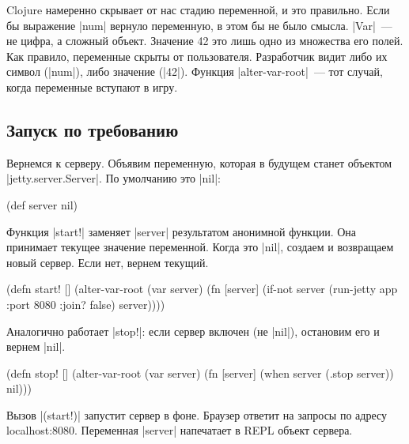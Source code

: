 Clojure намеренно скрывает от нас стадию переменной, и это правильно. Если бы
выражение \spverb|num| вернуло переменную, в этом бы не было смысла. \spverb|Var|~---
не цифра, а сложный объект. Значение 42 это лишь одно из множества его полей.
Как правило, переменные скрыты от пользователя. Разработчик видит либо их символ
(\spverb|num|), либо значение (\spverb|42|). Функция \spverb|alter-var-root|~---
тот случай, когда переменные вступают в игру.

\subsection{Запуск по требованию}

Вернемся к серверу. Объявим переменную, которая в будущем станет объектом
\spverb|jetty.server.Server|. По умолчанию это \spverb|nil|:

\begin{english}
  \begin{clojure}
(def server nil)
  \end{clojure}
\end{english}

Функция \spverb|start!| заменяет \spverb|server| результатом анонимной
функции. Она принимает текущее значение переменной. Когда это \spverb|nil|,
создаем и возвращаем новый сервер. Если нет, вернем текущий.

\begin{english}
  \begin{clojure}
(defn start! []
  (alter-var-root
   (var server)
   (fn [server]
     (if-not server
       (run-jetty app {:port 8080 :join? false})
       server))))
  \end{clojure}
\end{english}

\noindent
Аналогично работает \spverb|stop!|: если сервер включен (не \spverb|nil|),
остановим его и вернем \spverb|nil|.

\begin{english}
  \begin{clojure}
(defn stop! []
  (alter-var-root
   (var server)
   (fn [server]
     (when server
       (.stop server))
     nil)))
  \end{clojure}
\end{english}

Вызов \spverb|(start!)| запустит сервер в фоне. Браузер ответит на запросы по
адресу localhost:8080. Переменная \spverb|server| напечатает в REPL объект
сервера.

